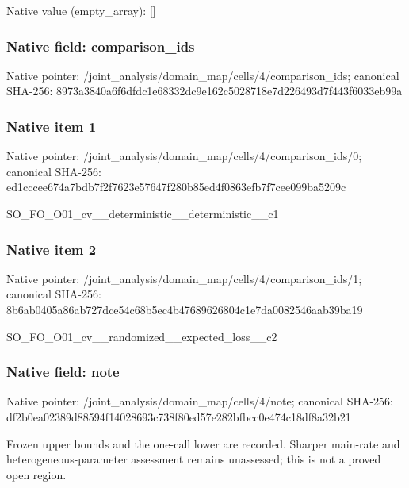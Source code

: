 \documentclass[10pt,a4paper]{article}
\begin{document}
Native value (empty\_\allowbreak{}array): []

\subsubsection{Native field: comparison\_\allowbreak{}ids}
Native pointer: /joint\_\allowbreak{}analysis/domain\_\allowbreak{}map/cells/4/comparison\_\allowbreak{}ids; canonical SHA-256: 8973a3840a6f6dfdc1e68332dc9e162c5028718e7d226493d7f443f6033eb99a

\subsubsection{Native item 1}
Native pointer: /joint\_\allowbreak{}analysis/domain\_\allowbreak{}map/cells/4/comparison\_\allowbreak{}ids/0; canonical SHA-256: ed1cccee674a7bdb7f2f7623e57647f280b85ed4f0863efb7f7cee099ba5209c

\begingroup\raggedright\sloppy SO\_\allowbreak{}FO\_\allowbreak{}O01\_\allowbreak{}cv\_\allowbreak{}\_\allowbreak{}deterministic\_\allowbreak{}\_\allowbreak{}deterministic\_\allowbreak{}\_\allowbreak{}c1\par\endgroup

\subsubsection{Native item 2}
Native pointer: /joint\_\allowbreak{}analysis/domain\_\allowbreak{}map/cells/4/comparison\_\allowbreak{}ids/1; canonical SHA-256: 8b6ab0405a86ab727dce54c68b5ec4b47689626804c1e7da0082546aab39ba19

\begingroup\raggedright\sloppy SO\_\allowbreak{}FO\_\allowbreak{}O01\_\allowbreak{}cv\_\allowbreak{}\_\allowbreak{}randomized\_\allowbreak{}\_\allowbreak{}expected\_\allowbreak{}loss\_\allowbreak{}\_\allowbreak{}c2\par\endgroup

\subsubsection{Native field: note}
Native pointer: /joint\_\allowbreak{}analysis/domain\_\allowbreak{}map/cells/4/note; canonical SHA-256: df2b0ea02389d88594f14028693c738f80ed57e282bfbcc0e474c18df8a32b21

\begingroup\raggedright\sloppy Frozen upper bounds and the one-call lower are recorded. Sharper main-rate and heterogeneous-parameter assessment remains unassessed;\allowbreak{} this is not a proved open region.\par\endgroup
\end{document}
